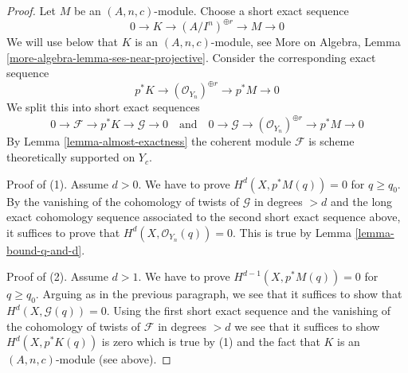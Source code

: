 \begin{proof}
Let $M$ be an $(A, n, c)$-module. Choose a short exact sequence
$$
0 \to K \to (A/I^n)^{\oplus r} \to M \to 0
$$
We will use below that $K$ is an $(A, n, c)$-module, see More on Algebra,
Lemma \ref{more-algebra-lemma-ses-near-projective}.
Consider the corresponding exact sequence
$$
p^*K \to (\mathcal{O}_{Y_n})^{\oplus r} \to p^*M \to 0
$$
We split this into short exact sequences
$$
0 \to \mathcal{F} \to p^*K \to \mathcal{G} \to 0
\quad\text{and}\quad
0 \to \mathcal{G} \to (\mathcal{O}_{Y_n})^{\oplus r} \to p^*M \to 0
$$
By Lemma \ref{lemma-almost-exactness} the coherent module $\mathcal{F}$
is scheme theoretically supported on $Y_c$.

\medskip\noindent
Proof of (1). Assume $d > 0$. We have to prove
$H^d(X, p^*M(q)) = 0$ for $q \geq q_0$.
By the vanishing of the cohomology of twists of $\mathcal{G}$ in degrees $> d$
and the long exact cohomology sequence associated to the second
short exact sequence above, it suffices to prove that
$H^d(X, \mathcal{O}_{Y_n}(q)) = 0$.
This is true by Lemma \ref{lemma-bound-q-and-d}.

\medskip\noindent
Proof of (2). Assume $d > 1$. We have to prove
$H^{d - 1}(X, p^*M(q)) = 0$ for $q \geq q_0$.
Arguing as in the previous paragraph, we see that it suffices
to show that $H^d(X, \mathcal{G}(q)) = 0$. Using the first
short exact sequence and the vanishing of the cohomology
of twists of $\mathcal{F}$ in degrees $> d$ we see that it suffices
to show $H^d(X, p^*K(q))$ is zero which is
true by (1) and the fact that $K$ is an $(A, n, c)$-module (see above).


\end{proof}
